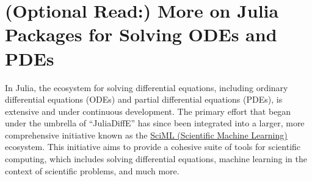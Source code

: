 \section{(Optional Read:) More on Julia Packages for Solving ODEs and PDEs}

In Julia, the ecosystem for solving differential equations, including ordinary differential equations (ODEs) and partial differential equations (PDEs), is extensive and under continuous development. The primary effort that began under the umbrella of ``JuliaDiffE'' has since been integrated into a larger, more comprehensive initiative known as the \href{https://docs.sciml.ai/Overview/stable/}{SciML (Scientific Machine Learning)} ecosystem. This initiative aims to provide a cohesive suite of tools for scientific computing, which includes solving differential equations, machine learning in the context of scientific problems, and much more.

